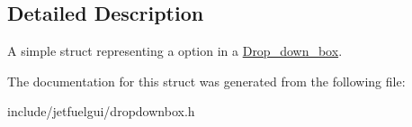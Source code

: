 \subsection{Detailed Description}
A simple struct representing a option in a \hyperlink{classjetfuel_1_1gui_1_1Drop__down__box}{Drop\+\_\+down\+\_\+box}. 

The documentation for this struct was generated from the following file\+:\begin{DoxyCompactItemize}
\item 
include/jetfuelgui/dropdownbox.\+h\end{DoxyCompactItemize}
